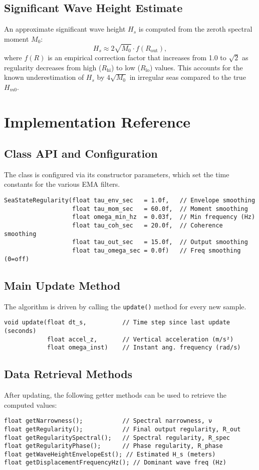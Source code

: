 \documentclass[11pt]{article}
\begin{document}
\subsection{Significant Wave Height Estimate}
An approximate significant wave height $H_s$ is computed from the zeroth spectral moment $M_0$:
\begin{equation}
H_s \approx 2 \sqrt{M_0} \cdot f(R_{\text{out}}),
\end{equation}
where $f(R)$ is an empirical correction factor that increases from 1.0 to $\sqrt{2}$ as regularity decreases from high ($R_{\text{hi}}$) to low ($R_{\text{lo}}$) values. This accounts for the known underestimation of $H_s$ by $4\sqrt{M_0}$ in irregular seas compared to the true $H_{m0}$.

\section{Implementation Reference}
\subsection{Class API and Configuration}
The class is configured via its constructor parameters, which set the time constants for the various EMA filters.
\begin{lstlisting}[style=codestyle]
SeaStateRegularity(float tau_env_sec   = 1.0f,   // Envelope smoothing
                   float tau_mom_sec   = 60.0f,  // Moment smoothing
                   float omega_min_hz  = 0.03f,  // Min frequency (Hz)
                   float tau_coh_sec   = 20.0f,  // Coherence smoothing
                   float tau_out_sec   = 15.0f,  // Output smoothing
                   float tau_omega_sec = 0.0f)   // Freq smoothing (0=off)
\end{lstlisting}

\subsection{Main Update Method}
The algorithm is driven by calling the \texttt{update()} method for every new sample.
\begin{lstlisting}[style=codestyle]
void update(float dt_s,          // Time step since last update (seconds)
            float accel_z,       // Vertical acceleration (m/s²)
            float omega_inst)    // Instant ang. frequency (rad/s)
\end{lstlisting}

\subsection{Data Retrieval Methods}
After updating, the following getter methods can be used to retrieve the computed values:
\begin{lstlisting}[style=codestyle]
float getNarrowness();           // Spectral narrowness, ν
float getRegularity();           // Final output regularity, R_out
float getRegularitySpectral();   // Spectral regularity, R_spec
float getRegularityPhase();      // Phase regularity, R_phase
float getWaveHeightEnvelopeEst(); // Estimated H_s (meters)
float getDisplacementFrequencyHz(); // Dominant wave freq (Hz)
\end{lstlisting}
\end{document}
